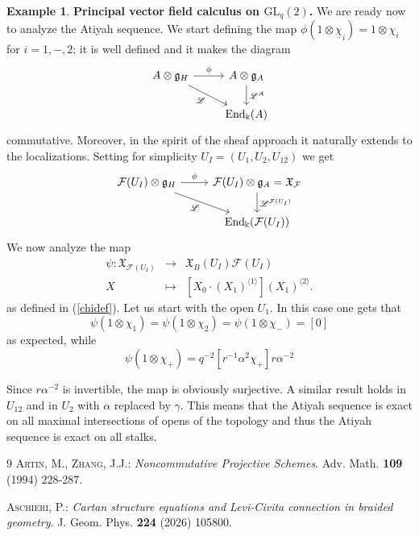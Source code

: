 \documentclass{article}
\theoremstyle{definition}
\newtheorem{example}[thm]{Example}
\newcommand{\Chi}{{\mathfrak{X}}}
\newcommand{\cF}{{\mathcal{F}}}
\begin{document}
{\begin{example} {\bf Principal vector field calculus on $\mathrm{GL}_q(2)$.}
	We are ready now to analyze the Atiyah sequence. We start defining the map $\phi(1\otimes \underline{\chi}_i)=1\otimes \chi_i$ for $i=1,-,2$; it is well defined and it makes the diagram 
	\begin{equation}
		\begin{tikzcd}
			A\otimes\mathfrak{g}_H\arrow{dr}[swap]{\mathscr{L}} \arrow{r}{\phi}
			& A\otimes \mathfrak{g}_A \arrow{d}{\mathscr{L}^A}\\
			& \mathrm{End}_\Bbbk(A)
		\end{tikzcd}
	\end{equation}
	commutative. Moreover, in the spirit of the sheaf approach it naturally extends to the localizations. Setting for simplicity $U_I=(U_1,U_2,U_{12})$ we get 
	\begin{equation}
		\begin{tikzcd}
			\cF(U_I)\otimes\mathfrak{g}_H\arrow{dr}[swap]{\mathscr{L}} \arrow{r}{\phi}
			& \cF(U_I)\otimes \mathfrak{g}_A \arrow{d}{\mathscr{L}^{\cF(U_I)}}=\Chi_\cF \\
			& \mathrm{End}_\Bbbk(\cF(U_I))
		\end{tikzcd}
	\end{equation}
	We now analyze the map 
	$$\begin{array}{rcl}
		\psi\colon\mathfrak{X}_{\cF(U_I)}&\to& \mathfrak{X}_B(U_I) \cF(U_I)\\[3mm]
		X&\mapsto& [X_0\cdot(X_1)^{\langle 1\rangle}](X_1)^{\langle 2\rangle}.
	\end{array}$$
	as defined in (\ref{chidef}). Let us start with the open $U_1$. In this case one gets that
	$$
	\psi(1\otimes \chi_1)=\psi(1\otimes \chi_2)=\psi(1\otimes \chi_-)=[0]
	$$
	as expected, while
	$$
	\psi(1\otimes \chi_+)=q^{-2}[r^{-1}\alpha^2 \chi_+]  r\alpha^{-2}
	$$
	
	
	Since $r\alpha^{-2}$ is invertible, the map is obviously surjective. A similar result holds in $U_{12}$ and in $U_2$ with $\alpha$ replaced by $\gamma$. This means that the Atiyah sequence is exact on all maximal intersections of opens of the topology and thus the Atiyah sequence is exact on all stalks.
\end{example}

\begin{thebibliography}{9}
	 \textsc{Artin, M., Zhang, J.J.:} \emph{Noncommutative Projective Schemes}. 
	Adv. Math. \textbf{109} (1994) 228-287.
	
	\textsc{Aschieri, P.:}
	\textit{Cartan structure equations and Levi-Civita connection in braided geometry}.
	J. Geom. Phys. \textbf{224} (2026) 105800.
	

\end{thebibliography}}
\end{document}

